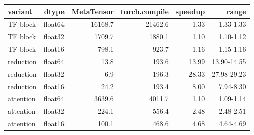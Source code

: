 \begin{tabular}{lrrrrr}
\toprule
variant & dtype & MetaTensor & torch.compile & speedup & range \\
\midrule
TF block & float64 & 16168.7 & 21462.6 & 1.33 & 1.33-1.33 \\
TF block & float32 & 1709.7 & 1880.1 & 1.10 & 1.10-1.12 \\
TF block & float16 & 798.1 & 923.7 & 1.16 & 1.15-1.16 \\
reduction & float64 & 13.8 & 193.6 & 13.99 & 13.90-14.55 \\
reduction & float32 & 6.9 & 196.3 & 28.33 & 27.98-29.23 \\
reduction & float16 & 24.2 & 193.4 & 8.00 & 7.94-8.30 \\
attention & float64 & 3639.6 & 4011.7 & 1.10 & 1.09-1.14 \\
attention & float32 & 224.1 & 556.4 & 2.48 & 2.48-2.51 \\
attention & float16 & 100.1 & 468.6 & 4.68 & 4.64-4.69 \\
\bottomrule
\end{tabular}
